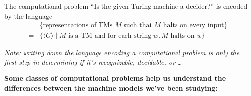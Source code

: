 \documentclass[12pt, oneside]{article}
\begin{document}
The computational problem ``Is the given Turing machine a decider?'' is encoded by the language
\begin{align*}
  &\{ \textrm{representations of TMs $M$  such that $M$ halts on every input}\}  \\
  =& \{ \langle G \rangle \mid M \textrm{ is a TM and for each string } w, \textrm{$M$ halts on $w$} \}
\end{align*}


{\it Note: writing down the language encoding a computational problem is only the first step in 
determining if it's recognizable, decidable, or \ldots }


{\bf Some classes of computational problems help us understand the differences between the machine models we've been studying:}

\vspace{-20pt}
\end{document}
